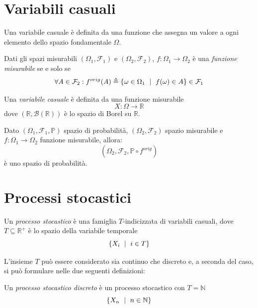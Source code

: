 \section{Variabili casuali}

Una variabile casuale è definita da una funzione che assegna un valore a ogni elemento dello spazio fondamentale $\Omega$.

\begin{mtdef}
	Dati gli spazi misurabili $(\Omega_1,\mathcal{F}_1)$ e $(\Omega_2,\mathcal{F}_2)$, $f:\Omega_1 \rightarrow \Omega_2$ è una \emph{funzione misurabile} se e solo se
	$$ \forall A \in \mathcal{F}_2 : f^{orig}(A) \triangleq \{\omega \in \Omega_1 \mbox{ }\mid\mbox{ } f(\omega) \in A \} \in \mathcal{F}_1 $$
\end{mtdef}

\begin{mtdef}
	Una \emph{variabile casuale} è definita da una funzione misurabile
	$$ X : \Omega \rightarrow \mathbb{R} $$
	dove $(\mathbb{R},\mathcal{B}(\mathbb{R}))$ è lo spazio di Borel su $\mathbb{R}$.
\end{mtdef}

\begin{mtpro}
	Dato $(\Omega_1,\mathcal{F}_1,\mathbb{P})$ spazio di probabilità, $(\Omega_2,\mathcal{F}_2)$ spazio misurabile e $f:\Omega_1 \rightarrow \Omega_2$ funzione misurabile, allora:
	$$ (\Omega_2, \mathcal{F}_2, \mathbb{P} \circ f^{orig}) $$
	è uno spazio di probabilità.
\end{mtpro}

\section{Processi stocastici}

\begin{mtdef}
	Un \emph{processo stocastico} è una famiglia $T$-indicizzata di variabili casuali, dove $T \subseteq \mathbb{R}^+$ è lo spazio della variabile temporale
	$$ \{X_i \mbox{ }\mid\mbox{ } i \in T\} $$
\end{mtdef}

L'insieme $T$ può essere considerato sia continuo che discreto e, a seconda del caso, si può formulare nelle due seguenti definizioni:

\begin{mtdef}
	Un \emph{processo stocastico discreto} è un processo stocastico con $T = \mathbb{N}$
	$$ \{X_n \mbox{ }\mid\mbox{ } n \in \mathbb{N}\} $$
\end{mtdef}

